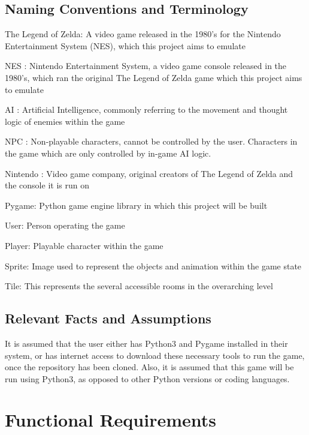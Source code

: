 \documentclass[12pt, titlepage]{article}
\begin{document}
\subsection{Naming Conventions and Terminology}
\begin{itemize}
    \item The Legend of Zelda: A video game released in the 1980's for the Nintendo Entertainment System (NES), which this project aims to emulate
    \item NES : Nintendo Entertainment System, a video game console released in the 1980's, which ran the original The Legend of Zelda game which this project aims to emulate
    \item AI : Artificial Intelligence, commonly referring to the movement and thought logic of enemies within the game
    \item NPC : Non-playable characters, cannot be controlled by the user. Characters in the game which are only controlled by in-game AI logic.
    \item Nintendo : Video game company, original creators of The Legend of Zelda and the console it is run on
    \item Pygame: Python game engine library in which this project will be built
    \item User: Person operating the game
    \item Player: Playable character within the game
    {\color{blue}\item Sprite: Image used to represent the objects and animation within the game state
    \item Tile: This represents the several accessible rooms in the overarching level}
    \end{itemize}
\newpage
\subsection{Relevant Facts and Assumptions}

It is assumed that the user either has Python3 and Pygame installed in their system, or has internet access to download these necessary tools to run the game, once the repository has been cloned. Also, it is assumed that this game will be run using Python3, as opposed to other Python versions or coding languages.

\section{Functional Requirements}
\end{document}
